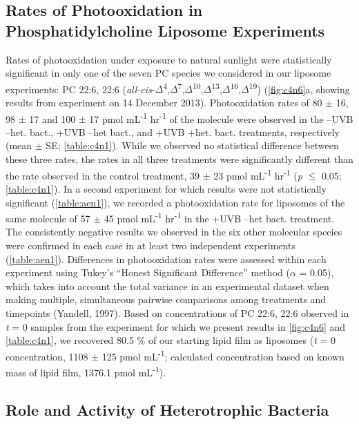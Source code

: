 \subsection{Rates of Photooxidation in Phosphatidylcholine Liposome Experiments}

Rates of photooxidation under exposure to natural sunlight were statistically significant in only one of the seven PC species we considered in our liposome experiments: PC 22:6, 22:6 (\emph{all-cis}-$\Delta$\textsuperscript{4},$\Delta$\textsuperscript{7},$\Delta$\textsuperscript{10},$\Delta$\textsuperscript{13},$\Delta$\textsuperscript{16},$\Delta$\textsuperscript{19}) (\autoref{fig:c4n6}a, showing results from experiment on 14 December 2013). Photooxidation rates of 80 $\pm$ 16, 98 $\pm$ 17 and 100 $\pm$ 17 pmol mL\textsuperscript{-1} hr\textsuperscript{-1} of the molecule were observed in the --UVB --het. bact., +UVB --het bact., and +UVB +het. bact. treatments, respectively (mean $\pm$ SE; \autoref{table:c4n1}). While we observed no statistical difference between these three rates, the rates in all three treatments were significantly different than the rate observed in the control treatment, 39 $\pm$ 23 pmol mL\textsuperscript{-1} hr\textsuperscript{-1} (\emph{p} $\leq$ 0.05; \autoref{table:c4n1}). In a second experiment for which results were not statistically significant (\autoref{table:aen1}), we recorded a photooxidation rate for liposomes of the same molecule of 57 $\pm$ 45 pmol mL\textsuperscript{-1} hr\textsuperscript{-1} in the +UVB --het bact. treatment. The consistently negative results we observed in the six other molecular species were confirmed in each case in at least two independent experiments (\autoref{table:aen1}). Differences in photooxidation rates were assessed within each experiment using Tukey's ``Honest Significant Difference'' method ($\alpha$ = 0.05), which takes into account the total variance in an experimental dataset when making multiple, simultaneous pairwise comparisons among treatments and timepoints (Yandell, 1997). Based on concentrations of PC 22:6, 22:6 observed in \emph{t} = 0 samples from the experiment for which we present results in \autoref{fig:c4n6} and \autoref{table:c4n1}, we recovered 80.5 \% of our starting lipid film as liposomes (\emph{t} = 0 concentration, 1108 $\pm$ 125 pmol mL\textsuperscript{-1}; calculated concentration based on known mass of lipid film, 1376.1 pmol mL\textsuperscript{-1}).

\subsection{Role and Activity of Heterotrophic Bacteria}
